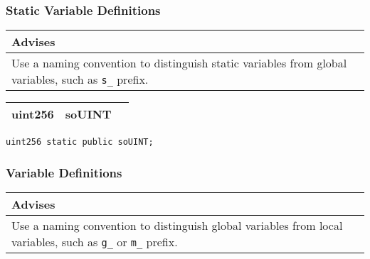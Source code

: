 \subsubsection{Static Variable Definitions}


\ifsoldraft
\noindent\begin{tabular}{|p{12cm}|}\hline
\rowcolor{green}Advises
\\\hline
Use a naming convention to distinguish static variables from global variables, such as \verb+s_+ prefix.
\\\hline\end{tabular}
\fi

\ifsoltables
\noindent\begin{tabular}{|l|l|p{5cm}|}\hline
uint256 & soUINT &  \\\hline
\end{tabular}
\fi


\begin{lstlisting}[firstnumber=13]
	uint256 static public soUINT;
\end{lstlisting}

\subsubsection{Variable Definitions}


\ifsoldraft
\noindent\begin{tabular}{|p{12cm}|}\hline
\rowcolor{green}Advises
\\\hline
Use a naming convention to distinguish global variables from local variables, such as \verb+g_+ or \verb+m_+ prefix.
\\\hline\end{tabular}
\fi

